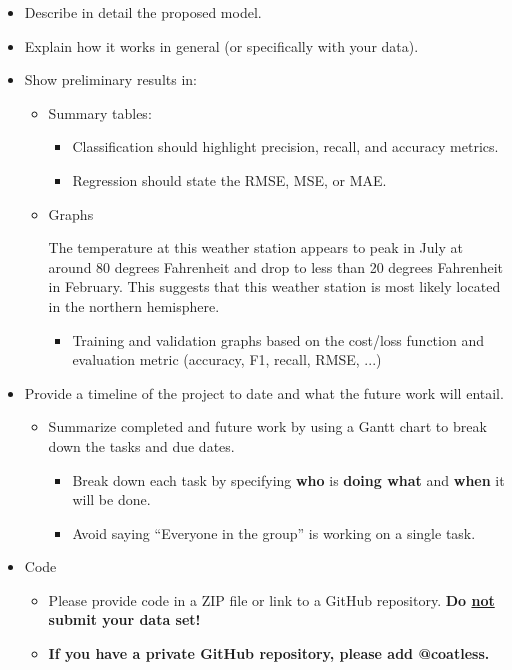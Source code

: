 \documentclass[conference]{IEEEtran}
\begin{document}
\begin{itemize}
  \item Describe in detail the proposed model.
  \item Explain how it works in general (or specifically with your data).
  \item Show preliminary results in:
  \begin{itemize}
    \item Summary tables:
    \begin{itemize}
      \item Classification should highlight precision, recall, and accuracy metrics.
      \item Regression should state the RMSE, MSE, or MAE.
    \end{itemize}
    \item Graphs

    The temperature at this weather station appears to peak in July at around 80 degrees Fahrenheit and drop to less than 20 degrees Fahrenheit in February. This suggests that this weather station is most likely located in the northern hemisphere. \\

    \begin{itemize}
      \item Training and validation graphs based on the cost/loss function and evaluation metric (accuracy, F1, recall, RMSE, ...)
    \end{itemize}
  \end{itemize}
  \item Provide a timeline of the project to date and what the future work will entail.
  \begin{itemize}
    \item Summarize completed and future work by using a Gantt chart to break down the tasks and due dates.
    \begin{itemize}
      \item Break down each task by specifying \textbf{who} is \textbf{doing what} and \textbf{when} it will be done.
      \item Avoid saying ``Everyone in the group'' is working on a single task.
    \end{itemize}
  \end{itemize}
  \item Code
  \begin{itemize}
    \item Please provide code in a ZIP file or link to a GitHub repository. \textbf{Do \underline{not} submit your data set!}
    \item \textbf{If you have a private GitHub repository, please add @coatless.}
  \end{itemize}
\end{itemize}
\end{document}

